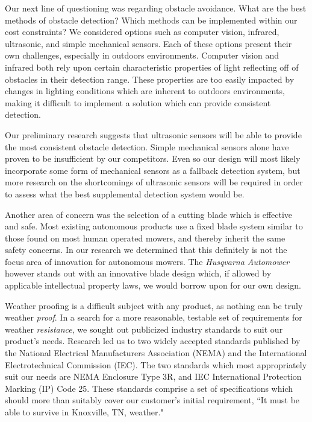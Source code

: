 \documentclass[12pt,letterpaper]{article}
\begin{document}
Our next line of questioning was regarding obstacle avoidance.  What are the
best methods of obstacle detection?  Which methods can be implemented within our
cost constraints?  We considered options such as computer vision, infrared,
ultrasonic, and simple mechanical sensors.  Each of these options present their
own challenges, especially in outdoors environments.  Computer vision and
infrared both rely upon certain characteristic properties of light reflecting
off of obstacles in their detection range.  These properties are too easily
impacted by changes in lighting conditions which are inherent to outdoors
environments, making it difficult to implement a solution which can provide
consistent detection.

Our preliminary research suggests that ultrasonic sensors will be able to
provide the most consistent obstacle detection.  Simple mechanical sensors alone
have proven to be insufficient by our competitors. Even so our design will most
likely incorporate some form of mechanical sensors as a fallback detection
system, but more research on the shortcomings of ultrasonic sensors will be
required in order to assess what the best supplemental detection system would
be.

Another area of concern was the selection of a cutting blade which is effective
and safe.  Most existing autonomous products use a fixed blade system similar to
those found on most human operated mowers, and thereby inherit the same safety
concerns.  In our research we determined that this definitely is not the focus
area of innovation for autonomous mowers. The \textit{Husqvarna
Automower}\autocite{automower} however stands out with an innovative blade
design which, if allowed by applicable intellectual property laws, we would
borrow upon for our own design.

Weather proofing is a difficult subject with any product, as nothing can be
truly weather \textit{proof}.  In a search for a more reasonable, testable set
of requirements for weather \textit{resistance}, we sought out publicized
industry standards to suit our product's needs.  Research led us to two widely
accepted standards published by the National Electrical Manufacturers
Association (NEMA) and the International Electrotechnical Commission (IEC).  The
two standards which most appropriately suit our needs are NEMA Enclosure Type
3R\autocite{nema3r}, and IEC International Protection Marking (IP) Code
25.\autocite{ip25}  These standards comprise a set of specifications which
should more than suitably cover our customer's initial requirement, ``It must be
able to survive in Knoxville, TN, weather."
\end{document}
